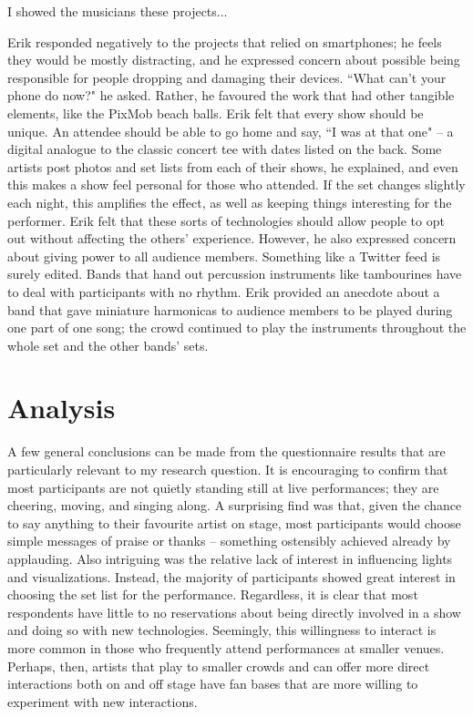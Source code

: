 I showed the musicians these projects...

Erik responded negatively to the projects that relied on smartphones; he feels they would be mostly distracting, and he expressed concern about possible being responsible for people dropping and damaging their devices. ``What can't your phone do now?" he asked. Rather, he favoured the work that had other tangible elements, like the PixMob beach balls. Erik felt that every show should be unique. An attendee should be able to go home and say, ``I was at that one" -- a digital analogue to the classic concert tee with dates listed on the back. Some artists post photos and set lists from each of their shows, he explained, and even this makes a show feel personal for those who attended. If the set changes slightly each night, this amplifies the effect, as well as keeping things interesting for the performer. Erik felt that these sorts of technologies should allow people to opt out without affecting the others' experience. However, he also expressed concern about giving power to all audience members. Something like a Twitter feed is surely edited. Bands that hand out percussion instruments like tambourines have to deal with participants with no rhythm. Erik provided an anecdote about a band that gave miniature harmonicas to audience members to be played during one part of one song; the crowd continued to play the instruments throughout the whole set and the other bands' sets.






\section{Analysis}

A few general conclusions can be made from the questionnaire results that are particularly relevant to my research question. It is encouraging to confirm that most participants are not quietly standing still at live performances; they are cheering, moving, and singing along. A surprising find was that, given the chance to say anything to their favourite artist on stage, most participants would choose simple messages of praise or thanks -- something ostensibly achieved already by applauding. Also intriguing was the relative lack of interest in influencing lights and visualizations. Instead, the majority of participants showed great interest in choosing the set list for the performance. Regardless, it is clear that most respondents have little to no reservations about being directly involved in a show and doing so with new technologies. Seemingly, this willingness to interact is more common in those who frequently attend performances at smaller venues. Perhaps, then, artists that play to smaller crowds and can offer more direct interactions both on and off stage have fan bases that are more willing to experiment with new interactions.
